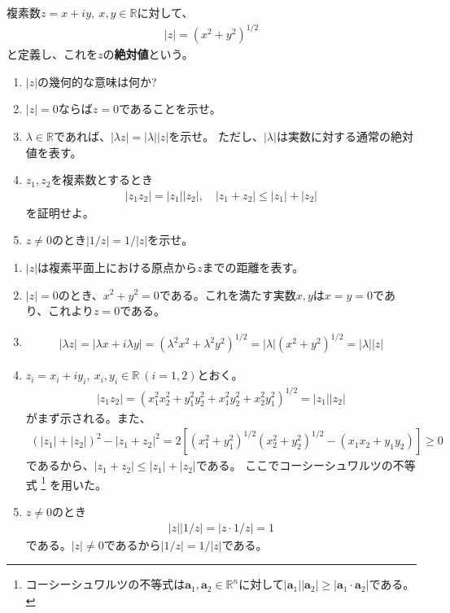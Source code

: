 \begin{renshu}
複素数$z=x+iy,\ x,y\in\mathbb{R}$に対して、
\begin{align}
    |z|=(x^{2}+y^{2})^{1/2}
\end{align}
と定義し、これを$z$の\textbf{絶対値}という。
\begin{enumerate}
\item $|z|$の幾何的な意味は何か?
\item $|z|=0$ならば$z=0$であることを示せ。
\item $\lambda\in\mathbb{R}$であれば、$|\lambda z|=|\lambda||z|$を示せ。
ただし、$|\lambda|$は実数に対する通常の絶対値を表す。
\item $z_{1},z_{2}$を複素数とするとき
\begin{align}
    |z_{1}z_{2}|=|z_{1}||z_{2}|,\quad |z_{1}+z_{2}|\leq|z_{1}|+|z_{2}|
\end{align}
を証明せよ。
\item $z\ne0$のとき$|1/z|=1/|z|$を示せ。
\end{enumerate}
\end{renshu}

\begin{kaitou*}
\begin{enumerate}
\item $|z|$は複素平面上における原点から$z$までの距離を表す。
\item $|z|=0$のとき、$x^{2}+y^{2}=0$である。これを満たす実数$x,y$は$x=y=0$であり、これより$z=0$である。
\item \begin{align*}
|\lambda z|=|\lambda x+i\lambda y|=(\lambda^{2}x^{2}+\lambda^{2}y^{2})^{1/2}
=|\lambda|(x^{2}+y^{2})^{1/2}=|\lambda||z|
\end{align*}
\item $z_{i}=x_{i}+iy_{i},\ x_{i},y_{i}\in\mathbb{R}\ (i=1,2)$とおく。
\begin{align*}
|z_{1}z_{2}|=(x_{1}^{2}x_{2}^{2}+y_{1}^{2}y_{2}^{2}+x_{1}^{2}y_{2}^{2}+x_{2}^{2}y_{1}^{2})^{1/2}=|z_{1}||z_{2}|
\end{align*}
がまず示される。また、
\begin{align*}
(|z_{1}|+|z_{2}|)^{2}-|z_{1}+z_{2}|^{2}=2[(x_{1}^{2}+y_{1}^{2})^{1/2}(x_{2}^{2}+y_{2}^{2})^{1/2}-(x_{1}x_{2}+y_{1}y_{2})]\geq0
\end{align*}
であるから、$|z_{1}+z_{2}|\leq|z_{1}|+|z_{2}|$である。
ここでコーシーシュワルツの不等式
\footnote{コーシーシュワルツの不等式は$\mathbf{a}_{1},\mathbf{a}_{2}\in\mathbb{R}^{n}$に対して$|\mathbf{a}_{1}||\mathbf{a}_{2}|\geq|\mathbf{a}_{1}\cdot\mathbf{a}_{2}|$である。}
を用いた。
\item $z\ne0$のとき
\begin{align*}
|z||1/z|=|z\cdot 1/z|=1
\end{align*}
である。$|z|\ne0$であるから$|1/z|=1/|z|$である。
\end{enumerate}
\end{kaitou*}